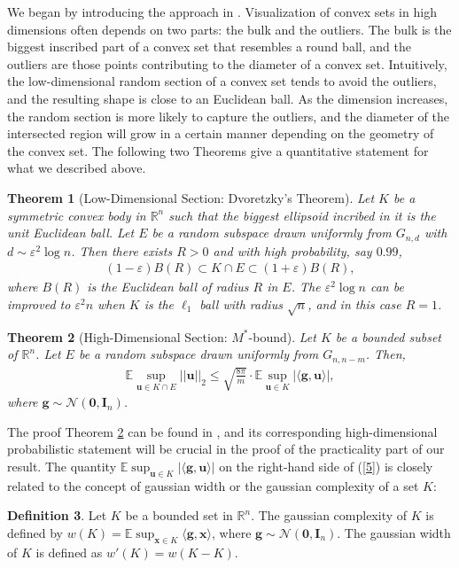 \documentclass[11pt]{article}
\numberwithin{equation}{section}
\theoremstyle{plain}
\newtheorem{Th}{Theorem}[section]
\theoremstyle{definition}
\newtheorem{Def}[Th]{Definition}
\def\R{{\mathbb R}}
\def\E{{\mathbb E}}
\def\R{{\mathbb R}}
\def\x{{\mathbf x}}
\def\e{{\varepsilon}}
\def\g{{\mathbf{g}}}
\def\u{{\mathbf{u}}}
\begin{document}
We began by introducing the approach in \cite{vershynin2015estimation}.    Visualization of convex sets in high dimensions often depends on two parts: the bulk and the outliers. The bulk is the biggest inscribed part of a convex set that resembles a round ball, and the outliers are those points contributing to the diameter of a convex set. Intuitively, the low-dimensional random section of a convex set tends to avoid the outliers, and the resulting shape is close to an Euclidean ball. As the dimension increases, the random section is more likely to capture the outliers, and the diameter of the intersected region will grow in a certain manner depending on the geometry of the convex set. The following two Theorems give a quantitative statement for what we described above. 

\begin{Th}[Low-Dimensional Section: Dvoretzky's Theorem]\label{T1}
Let $K$ be a symmetric convex body in $\R^n$ such that the biggest ellipsoid incribed in it is the unit Euclidean ball. Let $E$ be a random subspace drawn uniformly from $G_{n,d}$ with $d\sim \e^2\log n$. Then there exists $R>0$ and with high probability, say $0.99$, 
\begin{align}
(1-\e)B(R)\subset K\cap E\subset (1+\e)B(R),
\end{align}
where $B(R)$ is the Euclidean ball of radius $R$ in $E$. The $\e^2\log n$ can be improved to $\e^2 n$ when $K$ is the $\ell_1$ ball with radius $\sqrt{n}$, and in this case $R=1$.   
\end{Th}

\begin{Th}[High-Dimensional Section: $M^*$-bound]\label{T2}
Let $K$ be a bounded subset of $\R^n$. Let $E$ be a random subspace drawn uniformly from $G_{n,n-m}$. Then, 
\begin{align}
\E\sup_{\u\in K\cap E}||\u||_2\leq \sqrt{\frac{8\pi}{m}}\cdot\E\sup_{\u\in K}|\langle \g,\u\rangle|,\label{5}
\end{align}
where $\g\sim\mathcal{N}(\mathbf{0},\mathbf{I}_n)$. 
\end{Th}
The proof Theorem \ref{T2} can be found in \cite{vershynin2018high}, and its corresponding high-dimensional probabilistic statement will be crucial in the proof of the practicality part of our result. The quantity $\E\sup_{\u\in K}|\langle \g,\u\rangle|$ on the right-hand side of (\ref{5}) is closely related to the concept of gaussian width or the gaussian complexity of a set $K$:
\begin{Def}
Let $K$ be a bounded set in $\R^n$. The gaussian complexity of $K$ is defined by $w(K)=\E\sup_{\x\in K}\langle\g, \x\rangle$, where $\g\sim\mathcal{N}(\mathbf{0},\mathbf{I}_n)$. The gaussian width of $K$ is defined as $w'(K)=w(K-K)$. 
\end{Def}
\end{document}
